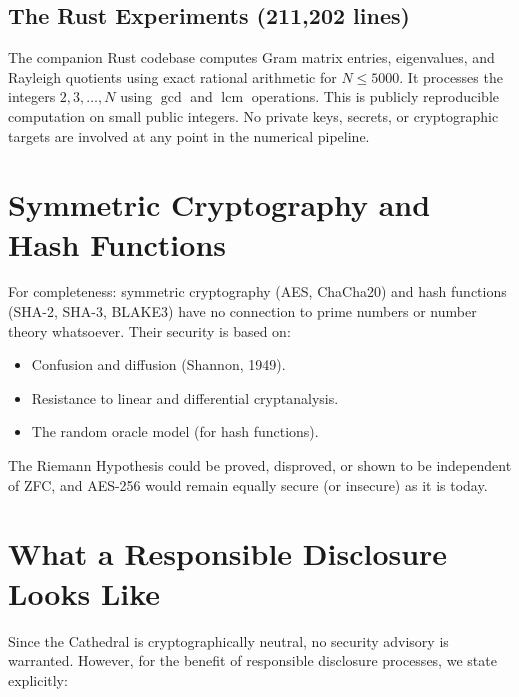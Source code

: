 \documentclass[11pt,a4paper]{article}
\begin{document}
\subsection{The Rust Experiments (211,202 lines)}

The companion Rust codebase computes Gram matrix entries, eigenvalues,
and Rayleigh quotients using exact rational arithmetic for
$N \leq 5000$. It processes the integers $2, 3, \ldots, N$
using $\gcd$ and $\operatorname{lcm}$ operations. This is publicly
reproducible computation on small public integers. No private keys,
secrets, or cryptographic targets are involved at any point in the
numerical pipeline.

\section{Symmetric Cryptography and Hash Functions}
\label{sec:symmetric}

For completeness: symmetric cryptography (AES, ChaCha20) and hash
functions (SHA-2, SHA-3, BLAKE3) have no connection to prime numbers
or number theory whatsoever. Their security is based on:

\begin{itemize}
  \item Confusion and diffusion (Shannon, 1949).
  \item Resistance to linear and differential cryptanalysis.
  \item The random oracle model (for hash functions).
\end{itemize}

The Riemann Hypothesis could be proved, disproved, or shown to be
independent of ZFC, and AES-256 would remain equally secure (or
insecure) as it is today.

\section{What a Responsible Disclosure Looks Like}
\label{sec:disclosure}

Since the Cathedral is cryptographically neutral, no security
advisory is warranted. However, for the benefit of responsible
disclosure processes, we state explicitly:
\end{document}
